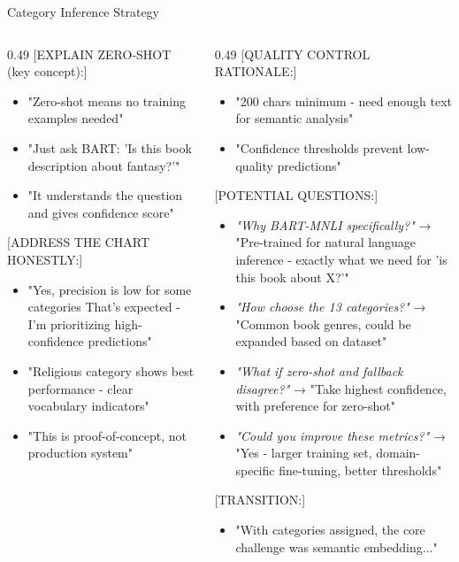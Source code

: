 \begin{frame}{Category Inference Strategy}
{\begin{columns}[T]
\begin{column}{0.49\textwidth}
      \vspace{0.1cm}
      [EXPLAIN ZERO-SHOT (key concept):]
      \begin{itemize}
        \item "Zero-shot means no training examples needed"
        \item "Just ask BART: 'Is this book description about fantasy?'"
        \item "It understands the question and gives confidence score"
      \end{itemize}
      
      \vspace{0.1cm}
      [ADDRESS THE CHART HONESTLY:]
      \begin{itemize}
        \item "Yes, precision is low for some categories That's expected - I'm prioritizing high-confidence predictions"
        \item "Religious category shows best performance - clear vocabulary indicators"
        \item "This is proof-of-concept, not production system"
      \end{itemize}
    \end{column}
    
    \begin{column}{0.49\textwidth}
      [QUALITY CONTROL RATIONALE:]
      \begin{itemize}
        \item "200 chars minimum - need enough text for semantic analysis"
        \item "Confidence thresholds prevent low-quality predictions"
      \end{itemize}
      
      \vspace{0.1cm}
      [POTENTIAL QUESTIONS:]
      \begin{itemize}
        \item \textit{"Why BART-MNLI specifically?"} → "Pre-trained for natural language inference - exactly what we need for 'is this book about X?'"
        \item \textit{"How choose the 13 categories?"} → "Common book genres, could be expanded based on dataset"
        \item \textit{"What if zero-shot and fallback disagree?"} → "Take highest confidence, with preference for zero-shot"
        \item \textit{"Could you improve these metrics?"} → "Yes - larger training set, domain-specific fine-tuning, better thresholds"
      \end{itemize}
      
      \vspace{0.1cm}
      [TRANSITION:]
      \begin{itemize}
        \item "With categories assigned, the core challenge was semantic embedding..."
      \end{itemize}
    \end{column}
  \end{columns}
}

\end{frame}